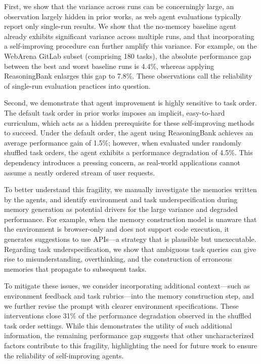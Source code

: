 \documentclass{article}
\begin{document}
First, we show that the variance across runs can be concerningly large, an observation largely hidden in prior works, as web agent evaluations typically report only single-run results. 
We show that the no-memory baseline agent already exhibits significant variance across multiple runs, and that incorporating a self-improving procedure can further amplify this variance.
For example, on the WebArena GitLab subset (comprising 180 tasks), the absolute performance gap between the best and worst baseline runs is 4.4\%, whereas applying ReasoningBank enlarges this gap to 7.8\%. These observations call the reliability of single-run evaluation practices into question.

Second, we demonstrate that agent improvement is highly sensitive to task order.
The default task order in prior works imposes an implicit, easy-to-hard curriculum, which acts as a hidden prerequisite for these self-improving methods to succeed.
Under the default order, the agent using ReasoningBank achieves an average performance gain of 1.5\%; however, when evaluated under randomly shuffled task orders, the agent exhibits a performance degradation of 4.5\%. 
This dependency introduces a pressing concern, as real-world applications cannot assume a neatly ordered stream of user requests.

To better understand this fragility, we manually investigate the memories written by the agents, and identify environment and task underspecification during memory generation as potential drivers for the large variance and degraded performance. 
For example, when the memory construction model is unaware that the environment is browser-only and does not support code execution, it generates suggestions to use APIs—a strategy that is plausible but unexecutable.
Regarding task underspecification, we show that ambiguous task queries can give rise to misunderstanding, overthinking, and the construction of erroneous memories that propagate to subsequent tasks.

To mitigate these issues, we consider incorporating additional context—such as environment feedback and task rubrics—into the memory construction step, and we further revise the prompt with clearer environment specifications. These interventions close 31\% of the performance degradation observed in the shuffled task order settings. While this demonstrates the utility of such additional information, the remaining performance gap suggests that other uncharacterized factors contribute to this fragility, highlighting the need for future work to ensure the reliability of self-improving agents.
\end{document}
